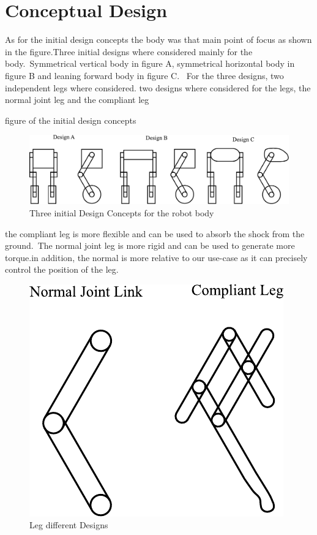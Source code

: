 \section{Conceptual Design}
As for the initial design concepts the body was that main point of focus as shown in the figure.Three initial designs where considered mainly for the body.\ Symmetrical vertical body in figure A, symmetrical horizontal body in figure B and leaning forward body in figure C.
\ For the three designs, two independent legs where considered.
two designs where considered for the legs, the normal joint leg and the compliant leg

 figure of the initial design concepts
\begin{figure}[h]
	\centering
	\includegraphics[width=1\linewidth]{Conceptual Design}
	\caption[Initial Design Concepts TEST]{Three initial Design Concepts for the robot body}
	\label{fig:initialdesigns}
\end{figure}



the compliant leg is more flexible and can be used to absorb the shock from the ground.\ The normal joint leg is more rigid and can be used to generate more torque.in addition, the normal is more relative to our use-case as it can precisely control the position of the leg.


\begin{figure}[h]
	\centering
	\includegraphics[width=0.4\linewidth]{Leg Design}
	\caption[between brakets for leg design]{Leg different Designs }
	\label{fig:legdesignsjbhi}
\end{figure}




